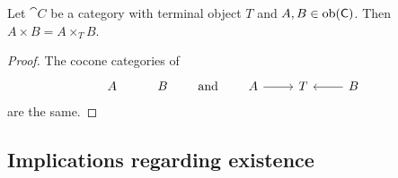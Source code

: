 \begin{lemma} \label{productAsPullback}
Let $\cat{C}$ be a category with terminal object $T$ and $A,B\in\operatorname{ob}(\mathsf{C})$. Then $A\times B = A\times_T B$.
\end{lemma}
\begin{proof}
The cocone categories of
\[ \begin{tikzcd}
A & B
\end{tikzcd} \qquad\text{and}\qquad \begin{tikzcd}
A \ar[r] & T & \ar[l] B
\end{tikzcd} \]
are the same.
\end{proof}


\subsection{Implications regarding existence}

